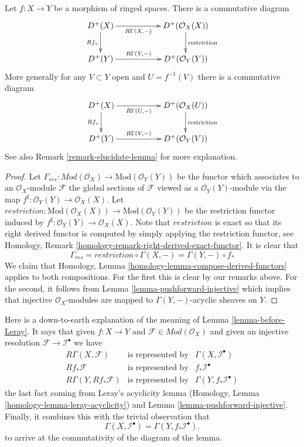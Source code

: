 \begin{lemma}
\label{lemma-before-Leray}
Let $f : X \to Y$ be a morphism of ringed spaces.
There is a commutative diagram
$$
\xymatrix{
D^{+}(X) \ar[rr]_-{R\Gamma(X, -)} \ar[d]_{Rf_*} & &
D^{+}(\mathcal{O}_X(X)) \ar[d]^{\text{restriction}} \\
D^{+}(Y) \ar[rr]^-{R\Gamma(Y, -)} & &
D^{+}(\mathcal{O}_Y(Y))
}
$$
More generally for any $V \subset Y$ open and $U = f^{-1}(V)$ there
is a commutative diagram
$$
\xymatrix{
D^{+}(X) \ar[rr]_-{R\Gamma(U, -)} \ar[d]_{Rf_*} & &
D^{+}(\mathcal{O}_X(U)) \ar[d]^{\text{restriction}} \\
D^{+}(Y) \ar[rr]^-{R\Gamma(V, -)} & &
D^{+}(\mathcal{O}_Y(V))
}
$$
See also Remark \ref{remark-elucidate-lemma} for more explanation.
\end{lemma}

\begin{proof}
Let
$\Gamma_{res} : \textit{Mod}(\mathcal{O}_X) \to \text{Mod}(\mathcal{O}_Y(Y))$
be the functor which associates to an $\mathcal{O}_X$-module $\mathcal{F}$
the global sections of $\mathcal{F}$ viewed as a $\mathcal{O}_Y(Y)$-module
via the map $f^\sharp : \mathcal{O}_Y(Y) \to \mathcal{O}_X(X)$. Let
$restriction : \text{Mod}(\mathcal{O}_X(X)) \to \text{Mod}(\mathcal{O}_Y(Y))$
be the restriction functor induced by
$f^\sharp : \mathcal{O}_Y(Y) \to \mathcal{O}_X(X)$. Note that $restriction$
is exact so that
its right derived functor is computed by simply applying the restriction
functor, see
Homology, Remark \ref{homology-remark-right-derived-exact-functor}.
It is clear that
$$
\Gamma_{res}
=
restriction \circ \Gamma(X, -)
=
\Gamma(Y, -) \circ f_*
$$
We claim that
Homology, Lemma \ref{homology-lemma-compose-derived-functors}
applies to both compositions. For the first this is clear by our remarks
above. For the second, it follows from
Lemma \ref{lemma-pushforward-injective} which implies that
injective $\mathcal{O}_X$-modules are mapped to $\Gamma(Y, -)$-acyclic
sheaves on $Y$.
\end{proof}

\begin{remark}
\label{remark-elucidate-lemma}
Here is a down-to-earth explanation of the meaning of
Lemma \ref{lemma-before-Leray}. It says that given
$f : X \to Y$ and $\mathcal{F} \in \textit{Mod}(\mathcal{O}_X)$
and given an injective resolution $\mathcal{F} \to \mathcal{I}^\bullet$
we have
$$
\begin{matrix}
R\Gamma(X, \mathcal{F}) & \text{is represented by} &
\Gamma(X, \mathcal{I}^\bullet) \\
Rf_*\mathcal{F} & \text{is represented by} & f_*\mathcal{I}^\bullet \\
R\Gamma(Y, Rf_*\mathcal{F}) & \text{is represented by} &
\Gamma(Y, f_*\mathcal{I}^\bullet)
\end{matrix}
$$
the last fact coming from Leray's acyclicity lemma
(Homology, Lemma \ref{homology-lemma-leray-acyclicity})
and Lemma \ref{lemma-pushforward-injective}.
Finally, it combines this with the trivial observation that
$$
\Gamma(X, \mathcal{I}^\bullet)
=
\Gamma(Y, f_*\mathcal{I}^\bullet).
$$
to arrive at the commutativity of the diagram of the lemma.
\end{remark}

